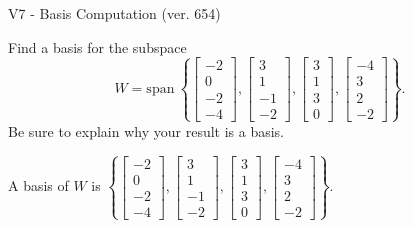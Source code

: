 \begin{exercise}
  \begin{exerciseTitle}V7 - Basis Computation (ver. 654)\end{exerciseTitle}
  \begin{exerciseStatement}
    Find a basis for the subspace 
\[W=\mathrm{span}\ \left\{\left[\begin{array}{r}
-2 \\
0 \\
-2 \\
-4
\end{array}\right] , \left[\begin{array}{r}
3 \\
1 \\
-1 \\
-2
\end{array}\right] , \left[\begin{array}{r}
3 \\
1 \\
3 \\
0
\end{array}\right] , \left[\begin{array}{r}
-4 \\
3 \\
2 \\
-2
\end{array}\right]\right\}.\]
 Be sure to explain why your result is a basis.


  \end{exerciseStatement}
  \begin{exerciseAnswer}
   A basis of \(W\) is  \(\left\{\left[\begin{array}{r}
-2 \\
0 \\
-2 \\
-4
\end{array}\right] , \left[\begin{array}{r}
3 \\
1 \\
-1 \\
-2
\end{array}\right] , \left[\begin{array}{r}
3 \\
1 \\
3 \\
0
\end{array}\right] , \left[\begin{array}{r}
-4 \\
3 \\
2 \\
-2
\end{array}\right]\right\}\).
  


  \end{exerciseAnswer}
\end{exercise}